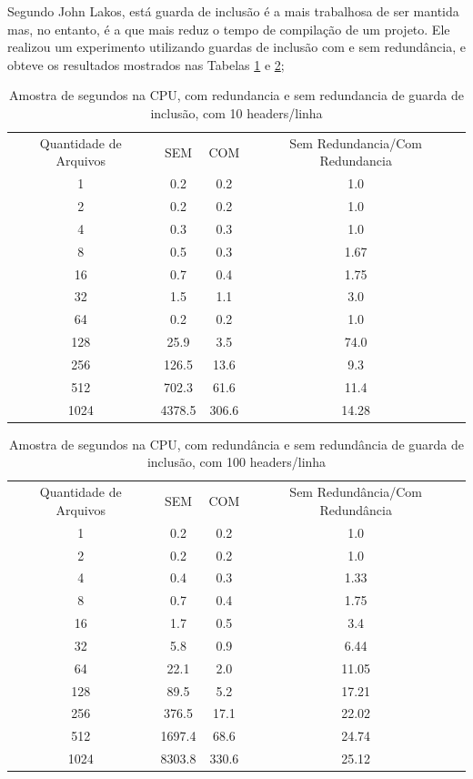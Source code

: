 \begin{enumerate}
Segundo John Lakos, está guarda de inclusão é a mais trabalhosa de ser mantida
 mas, no entanto, é a que mais reduz o tempo de compilação de um projeto. Ele
 realizou um experimento utilizando guardas de inclusão com e sem redundância,
 e obteve os resultados mostrados nas Tabelas \ref{tab:tabela_01} e 
\ref{tab:tabela_02};

\begin{table}[h]
    \label{tab:tabela_01}
    \caption {Amostra de segundos na CPU, com redundancia e sem redundancia
               de guarda de inclusão, com 10 headers/linha }
    \centering
    \begin{tabular}{ |c | c | c | c |}
    \hline
    Quantidade de Arquivos & SEM & COM & Sem Redundancia/Com Redundancia\\
    1 & 0.2 & 0.2 & 1.0\\
    2 & 0.2 & 0.2 & 1.0\\
    4 & 0.3 & 0.3 & 1.0\\
    8 & 0.5 & 0.3 & 1.67\\
    16 & 0.7 & 0.4 & 1.75\\
    32 & 1.5 & 1.1 & 3.0\\
    64 & 0.2 & 0.2 & 1.0\\
    128 & 25.9 & 3.5 & 74.0\\
    256 & 126.5 & 13.6 & 9.3\\
    512 & 702.3 & 61.6 & 11.4\\
    1024 & 4378.5 & 306.6 & 14.28\\
    \hline
    \end{tabular}
\end{table}


\begin{table}[h]
    \label{tab:tabela_02}
    \centering
    \caption {Amostra de segundos na CPU, com redundância e sem redundância
               de guarda de inclusão, com 100 headers/linha }
    \begin{tabular}{ |c | c | c | c |}
    \hline
    Quantidade de Arquivos & SEM & COM & Sem Redundância/Com Redundância\\
    1 & 0.2 & 0.2 & 1.0\\
    2 & 0.2 & 0.2 & 1.0\\
    4 & 0.4 & 0.3 & 1.33\\
    8 & 0.7 & 0.4 & 1.75\\
    16 & 1.7 & 0.5 & 3.4\\
    32 & 5.8 & 0.9 & 6.44\\
    64 & 22.1 & 2.0 & 11.05\\
    128 & 89.5 & 5.2 & 17.21\\
    256 & 376.5 & 17.1 & 22.02\\
    512 & 1697.4 & 68.6 & 24.74\\
    1024 & 8303.8 & 330.6 & 25.12\\
    \hline
    \end{tabular}
\end{table}


\end{enumerate}
